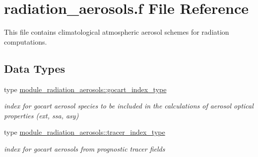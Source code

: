 \hypertarget{radiation__aerosols_8f}{}\section{radiation\+\_\+aerosols.\+f File Reference}
\label{radiation__aerosols_8f}


This file contains climatological atmospheric aerosol schemes for radiation computations.  


\subsection*{Data Types}
\begin{DoxyCompactItemize}
\item 
type \hyperlink{structmodule__radiation__aerosols_1_1gocart__index__type}{module\+\_\+radiation\+\_\+aerosols\+::gocart\+\_\+index\+\_\+type}
\begin{DoxyCompactList}\small\item\em index for gocart aerosol species to be included in the calculations of aerosol optical properties (ext, ssa, asy) \end{DoxyCompactList}\item 
type \hyperlink{structmodule__radiation__aerosols_1_1tracer__index__type}{module\+\_\+radiation\+\_\+aerosols\+::tracer\+\_\+index\+\_\+type}
\begin{DoxyCompactList}\small\item\em index for gocart aerosols from prognostic tracer fields \end{DoxyCompactList}\end{DoxyCompactItemize}

